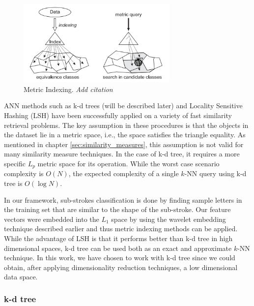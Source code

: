 \begin{figure}
\centering
\includegraphics[width=0.7\textwidth]{./figures/indexing}       
\caption{Metric Indexing. \emph{Add citation}}
\label{fig:indexing}
\end{figure}


\iftoggle{edit-mode}{\hspace{0pt}\marginpar{Examples of Exact and Approximate Indexing}}{}
ANN methods such as k-d trees (will be described later) and Locality Sensitive Hashing (LSH) \cite{gionis1999similarity} have been successfully applied on a variety of fast similarity retrieval problems. The key assumption in these procedures is that the objects in the dataset lie in a metric space, i.e., the space satisfies the triangle equality. As mentioned in chapter \ref{sec:similarity_measures}, this assumption is not valid for many similarity measure techniques. In the case of k-d tree, it requires a more specific $L_p$ metric space for its operation. While the worst case scenario complexity is $O(N)$, the expected complexity of a single $k$-NN query using k-d tree is $O(\log N)$.

\iftoggle{edit-mode}{\hspace{0pt}\marginpar{This work}}{}
In our framework, sub-strokes classification is done by finding sample letters in the training set that are similar to the shape of the sub-stroke. Our feature vectors were embedded into the $L_1$ space by using the wavelet embedding technique described earlier and thus metric indexing methods can be applied. While the advantage of LSH is that it performs better than k-d tree in high dimensional spaces, k-d tree can be used both as an exact and approximate $k$-NN technique. In this work, we have chosen to work with k-d tree since we could obtain, after applying dimensionality reduction techniques, a low dimensional data space.

\subsubsection{k-d tree}
\label{subsubsec:kd_tree}

